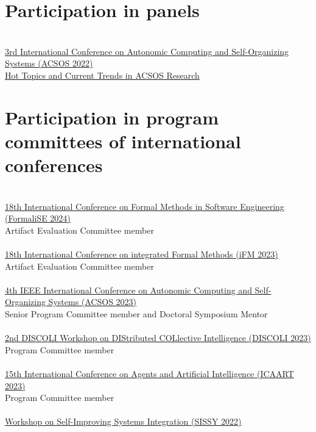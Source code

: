 \section{{\color{black}Participation in panels}}
\halfblankline \\
\href{https://2022.acsos.org/details/acsos-2022-papers/36/Hot-Topics-and-Current-Trends-in-ACSOS-Research}
{3rd International Conference on Autonomic Computing and Self-Organizing Systems (ACSOS 2022)}
\\ \href{https://danysk.github.io/Slides-2022-ACSOS-Panel/#/}{Hot Topics and Current Trends in ACSOS Research} \\

\section{{\color{black}Participation in program committees of international conferences}}
\halfblankline \\
\href{https://formalise2024.github.io/}{18th International Conference on Formal Methods in Software Engineering (FormaliSE 2024)}
\\ Artifact Evaluation Committee member \\
\halfblankline \\
\href{https://liacs.leidenuniv.nl/~bonsanguemm/ifm23/}{18th International Conference on integrated Formal Methods
(iFM 2023)}
\\ Artifact Evaluation Committee member \\
\halfblankline \\
\href{https://2023.acsos.org/}{4th IEEE International Conference on Autonomic Computing and Self-Organizing Systems (ACSOS 2023)}
\\ Senior Program Committee member and Doctoral Symposium Mentor \\
\halfblankline \\
\href{https://discoli-workshop.github.io/2023/}{2nd DISCOLI Workshop on DIStributed COLlective Intelligence (DISCOLI 2023)}
\\ Program Committee member \\
\halfblankline \\
\href{https://icaart.scitevents.org/}{15th International Conference on Agents and Artificial Intelligence
(ICAART 2023)}
\\ Program Committee member \\
\halfblankline \\
\href{https://sissy.telecom-paristech.fr/}{Workshop on Self-Improving Systems Integration (SISSY 2022)}
